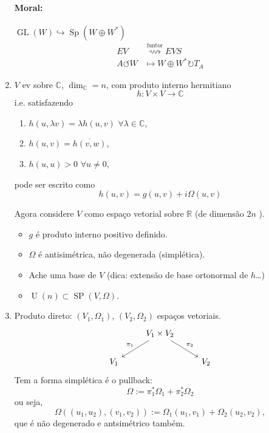 \begin{example}
\begin{enumerate}
\paragraph{Moral:} $\operatorname{GL}(W)\hookrightarrow \operatorname{Sp}(W\oplus W^{*} )$ 
\begin{align*}
	EV&\overset{\text{funtor} }{\rightsquigarrow}EVS\\
	A\circlearrowleft W&\longmapsto W\oplus W^{*} \circlearrowright T_{A}
\end{align*}

\item $V$ ev sobre $\mathbb{C}$, $\dim_{\mathbb{C}}=n$, com produto interno hermitiano
	\[h:V\times V\to \mathbb{C}\]
i.e. satisfazendo
\begin{enumerate}
	\item $h(u,\lambda v)=\lambda h(u,v)$  $\forall \lambda\in \mathbb{C}$,
	\item $h(u,v)=\overline{h(v,w)}$,
	\item $h(u,u)>0$ $\forall u\neq 0$,
\end{enumerate}
pode ser escrito como
\[h(u,v)=g(u,v)+i\Omega(u,v)\]

Agora considere $V$ como espa\c co vetorial sobre $\mathbb{R}$ (de dimens\~ao $2n$ ).

\begin{exercise}\leavevmode 
	\begin{itemize}
		\item $g$ \'e produto interno positivo definido.
		\item $\Omega$ \'e antisim\'etrica, n\~ao degenerada (simpl\'etica).
		\item Ache uma base de $V$ (dica: extens\~ao de base ortonormal de $h$…)
		\item $\operatorname{U}(n)\subset \operatorname{SP}(V,\Omega)$.
	\end{itemize}
\end{exercise}

\item Produto direto: $(V_1,\Omega_1)$, $(V_2,\Omega_2)$ espa\c cos vetoriais.
	\[\begin{tikzcd}
		&V_1\times V_2\arrow[ld,"\pi_1",swap]\arrow[rd,"\pi_2"]\\
		V_1&&V_2
	\end{tikzcd}\]
Tem a forma simpl\'etica \'e o pullback:
	\[\Omega:=\pi_1^{*} \Omega_1+\pi_2^{*} \Omega_2\]
	ou seja,
	\[\Omega((u_1,u_2),(v_1,v_2)):=\Omega_1(u_1,v_1)+\Omega_2(u_2,v_2),\]
	que \'e n\~ao degenerado e antsim\'etrico tamb\'em.
\end{enumerate}
\end{example}

